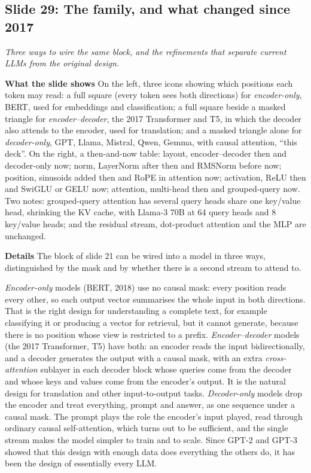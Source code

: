 \documentclass[11pt,letterpaper]{article}
\newcommand{\slide}[3]{%
  \subsection[Slide #1: #2]{Slide #1: #2}%
  {\color{muted}\itshape #3\par}\medskip}
\newcommand{\para}[1]{\medskip\noindent\textbf{#1}\quad}
\begin{document}
\slide{29}{The family, and what changed since 2017}{Three ways to wire the same block, and the refinements that separate current LLMs from the original design.}

\para{What the slide shows} On the left, three icons showing which positions each token may read: a full square (every token sees both directions) for \emph{encoder-only}, BERT, used for embeddings and classification; a full square beside a masked triangle for \emph{encoder--decoder}, the 2017 Transformer and T5, in which the decoder also attends to the encoder, used for translation; and a masked triangle alone for \emph{decoder-only}, GPT, Llama, Mistral, Qwen, Gemma, with causal attention, ``this deck''. On the right, a then-and-now table: layout, encoder--decoder then and decoder-only now; norm, LayerNorm after then and RMSNorm before now; position, sinusoids added then and RoPE in attention now; activation, ReLU then and SwiGLU or GELU now; attention, multi-head then and grouped-query now. Two notes: grouped-query attention has several query heads share one key/value head, shrinking the KV cache, with Llama-3 70B at 64 query heads and 8 key/value heads; and the residual stream, dot-product attention and the MLP are unchanged.

\para{Details} The block of slide 21 can be wired into a model in three ways, distinguished by the mask and by whether there is a second stream to attend to.

\emph{Encoder-only} models (BERT, 2018) use no causal mask: every position reads every other, so each output vector summarises the whole input in both directions. That is the right design for understanding a complete text, for example classifying it or producing a vector for retrieval, but it cannot generate, because there is no position whose view is restricted to a prefix. \emph{Encoder--decoder} models (the 2017 Transformer, T5) have both: an encoder reads the input bidirectionally, and a decoder generates the output with a causal mask, with an extra \emph{cross-attention} sublayer in each decoder block whose queries come from the decoder and whose keys and values come from the encoder's output. It is the natural design for translation and other input-to-output tasks. \emph{Decoder-only} models drop the encoder and treat everything, prompt and answer, as one sequence under a causal mask. The prompt plays the role the encoder's input played, read through ordinary causal self-attention, which turns out to be sufficient, and the single stream makes the model simpler to train and to scale. Since GPT-2 and GPT-3 showed that this design with enough data does everything the others do, it has been the design of essentially every LLM.
\end{document}
